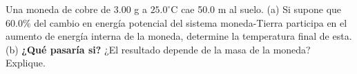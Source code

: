 \item Una moneda de cobre de 3.00 g a $25.0^\circ\text{C}$ cae 50.0 m al suelo. (a) Si supone que 60.0\% del cambio en energía potencial del sistema moneda-Tierra participa en el aumento de energía interna de la moneda, determine la temperatura final de esta. (b) \textbf{¿Qué pasaría si?} ¿El resultado depende de la masa de la moneda? Explique.
